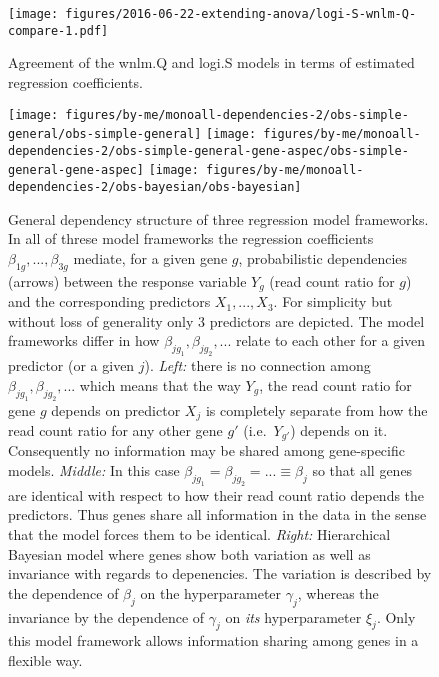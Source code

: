 \documentclass[letterpaper]{article}
\begin{document}
\begin{figure}
\begin{center}
\texttt{[image: figures/2016-06-22-extending-anova/logi-S-wnlm-Q-compare-1.pdf]}
\end{center}
\caption{
Agreement of the wnlm.Q and logi.S models in terms of estimated regression
coefficients.
}
\label{fig:logi.S-wnlm.Q-compare}
\end{figure}

\begin{figure}
\begin{center}
\texttt{[image: figures/by-me/monoall-dependencies-2/obs-simple-general/obs-simple-general]}
\hspace{\fill}
\texttt{[image: figures/by-me/monoall-dependencies-2/obs-simple-general-gene-aspec/obs-simple-general-gene-aspec]}
\hspace{\fill}
\texttt{[image: figures/by-me/monoall-dependencies-2/obs-bayesian/obs-bayesian]}
\end{center}
\caption{ General dependency structure of three regression model frameworks.
In all of threse model frameworks the regression coefficients
\(\beta_{1g},...,\beta_{3g}\) mediate, for a given gene \(g\), probabilistic
dependencies (arrows) between the response variable \(Y_g\) (read count ratio
for \(g\)) and the corresponding predictors \(X_1,...,X_3\).  For simplicity
but without loss of generality only 3 predictors are depicted.  The model
frameworks differ in how \(\beta_{jg_1},\beta_{jg_2},...\) relate to each
other for a given predictor (or a given \(j\)).  \emph{Left:} there is no
connection among \(\beta_{jg_1},\beta_{jg_2},...\) which means that the way
\(Y_{g}\), the read count ratio for gene \(g\) depends on predictor \(X_j\) is
completely separate from how the read count ratio for any other gene \(g'\)
(i.e.~\(Y_{g'}\)) depends on it.  Consequently no information may be shared
among gene-specific models.  \emph{Middle:} In this case
\(\beta_{jg_1}=\beta_{jg_2}=...\equiv\beta_j\) so that all genes are identical
with respect to how their read count ratio depends the predictors.  Thus genes
share all information in the data in the sense that the model forces them to
be identical.  \emph{Right:} Hierarchical Bayesian model where genes show both
variation as well as invariance with regards to depenencies.  The variation is
described by the dependence of \(\beta_j\) on the hyperparameter \(\gamma_j\),
whereas the invariance by the dependence of \(\gamma_j\) on \emph{its}
hyperparameter \(\xi_j\).  Only this model framework allows information
sharing among genes in a flexible way.  }
\label{fig:glm-vs-hierarch}
\end{figure}
\end{document}

